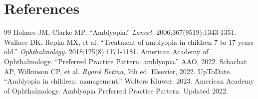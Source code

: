 \section*{References}
\begin{thebibliography}{99}
 Holmes JM, Clarke MP. ``Amblyopia.'' \textit{Lancet}. 2006;367(9519):1343-1351.
 Wallace DK, Repka MX, et al. ``Treatment of amblyopia in children 7 to 17 years old.'' \textit{Ophthalmology}. 2018;125(8):1171-1181.
 American Academy of Ophthalmology. ``Preferred Practice Pattern: amblyopia.'' AAO, 2022.
 Schachat AP, Wilkinson CP, et al. \textit{Ryan\'s Retina}, 7th ed. Elsevier, 2022.
 UpToDate. ``Amblyopia in children: management.'' Wolters Kluwer, 2023.
 American Academy of Ophthalmology. Amblyopia Preferred Practice Pattern. Updated 2022.
\end{thebibliography}

